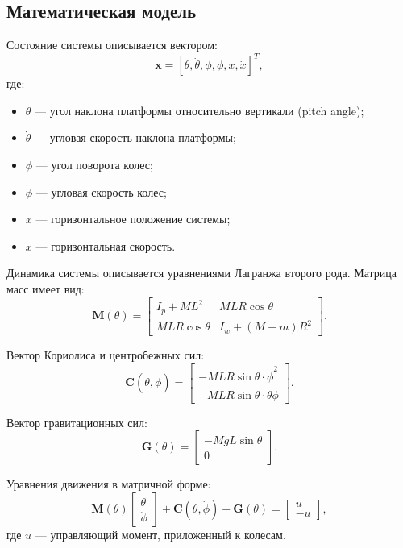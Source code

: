 \subsection{Математическая модель}

Состояние системы описывается вектором:
\[
\mathbf{x} = [\theta, \dot{\theta}, \phi, \dot{\phi}, x, \dot{x}]^T,
\]
где:
\begin{itemize}
    \item $\theta$ --- угол наклона платформы относительно вертикали (pitch angle);
    \item $\dot{\theta}$ --- угловая скорость наклона платформы;
    \item $\phi$ --- угол поворота колес;
    \item $\dot{\phi}$ --- угловая скорость колес;
    \item $x$ --- горизонтальное положение системы;
    \item $\dot{x}$ --- горизонтальная скорость.
\end{itemize}

Динамика системы описывается уравнениями Лагранжа второго рода. Матрица масс имеет вид:
\[
\mathbf{M}(\theta) = \begin{bmatrix}
I_p + M L^2 & M L R \cos\theta \\
M L R \cos\theta & I_w + (M + m) R^2
\end{bmatrix}.
\]

Вектор Кориолиса и центробежных сил:
\[
\mathbf{C}(\theta, \dot{\phi}) = \begin{bmatrix}
-M L R \sin\theta \cdot \dot{\phi}^2 \\
-M L R \sin\theta \cdot \dot{\theta} \dot{\phi}
\end{bmatrix}.
\]

Вектор гравитационных сил:
\[
\mathbf{G}(\theta) = \begin{bmatrix}
-M g L \sin\theta \\
0
\end{bmatrix}.
\]

Уравнения движения в матричной форме:
\[
\mathbf{M}(\theta) \begin{bmatrix} \ddot{\theta} \\ \ddot{\phi} \end{bmatrix} + \mathbf{C}(\theta, \dot{\phi}) + \mathbf{G}(\theta) = \begin{bmatrix} u \\ -u \end{bmatrix},
\]
где $u$ --- управляющий момент, приложенный к колесам.


